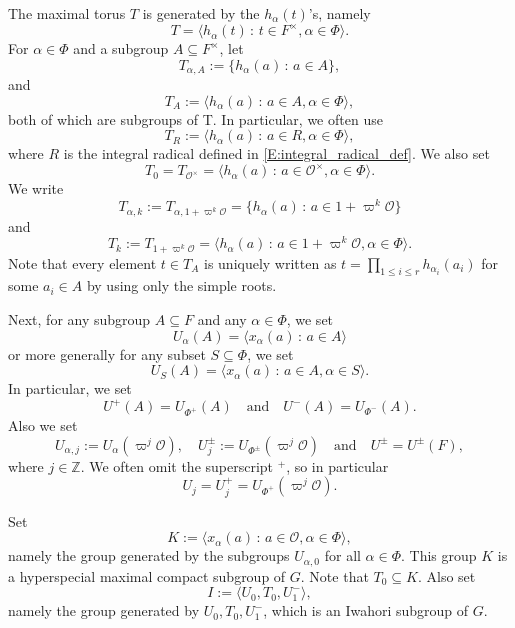 \documentclass[10pt, letterpaper]{amsart}
\theoremstyle{plain}
\theoremstyle{definition}
\numberwithin{equation}{section}
\newcommand{\Z}{\mathbb{Z}}
\newcommand{\ha}{h_{\alpha}}
\newcommand{\Ocal}{\mathcal{O}}
\newcommand{\la}{\langle}
\newcommand{\ra}{\rangle}
\newcommand{\st}{\,:\,}
\newcommand{\qand}{{\quad\text{and}\quad}}
\begin{document}
The maximal torus $T$ is generated by the $\ha(t)$'s, namely
\[
T=\la\ha(t)\st t\in F^\times, \alpha\in\Phi\ra.
\]
For $\alpha\in \Phi$ and a subgroup $A\subseteq F^{\times}$, let 
\[
T_{\alpha, A}:=\{h_{\alpha}(a)\st a\in A\},
\]
and
\[
T_A:=\la h_{\alpha}(a)\st a\in A, \alpha\in\Phi\ra,
\]
both of which are subgroups of T. In particular, we often use
\begin{equation}\label{E:def_of_T_R}
T_R:=\la h_{\alpha}(a)\st a\in R, \alpha\in\Phi\ra,
\end{equation}
where $R$ is the integral radical defined in \eqref{E:integral_radical_def}. We also set
\begin{equation}\label{E:def_of_T_0}
T_0=T_{\Ocal^{\times}}=\la h_{\alpha}(a)\st a\in \Ocal^{\times}, \alpha\in\Phi\ra.
\end{equation}
We write
\[
T_{\alpha, k}:=T_{\alpha, 1+\varpi^k\Ocal}=\{h_{\alpha}(a)\st a\in 1+\varpi^k\Ocal\}
\]
and
\begin{equation}\label{E:def_of_T_k}
T_{k}:=T_{1+\varpi^k\Ocal}=\la h_{\alpha}(a)\st a\in 1+\varpi^k\Ocal, \alpha\in\Phi\ra.
\end{equation}
Note that every element $t\in T_{A}$ is uniquely written as $t=\prod_{1\leq i\leq r}h_{\alpha_{i}}(a_{i})$ for some $a_i\in A$ by using only the simple roots. 


Next, for any subgroup $A\subseteq F$ and any $\alpha\in\Phi$, we set 
\[
U_{\alpha}(A)=\la x_{\alpha}(a)\st a\in A\ra
\] 
or more generally for any subset $S\subseteq \Phi$, we set
\[
U_{S}(A)=\la x_{\alpha}(a)\st a\in A, \alpha\in S\ra.
\] 
In particular, we set
\[
U^{+}(A)=U_{\Phi^{+}}(A)\qand U^{-}(A)=U_{\Phi^{-}}(A).
\]
Also we set
\begin{equation}\label{E:notation_U_alpha_j}
U_{\alpha, j}:=U_{\alpha}(\varpi^j\Ocal),\quad U_j^{\pm}:=U_{\Phi^{\pm}}(\varpi^j\Ocal)\qand U^{\pm}=U^{\pm}(F),
\end{equation}
where $j\in\Z$. We often omit the superscript $^+$, so in particular
\begin{equation}\label{E:notation_U_j}
U_j=U_j^+=U_{\Phi^{+}}(\varpi^j\Ocal).
\end{equation}

Set
\[
K:=\la x_{\alpha}(a)\st a\in\Ocal, \alpha\in\Phi\ra,
\]
namely the group generated by the subgroups $U_{\alpha,0}$ for all $\alpha\in\Phi$. This group $K$ is a hyperspecial maximal compact subgroup of $G$. Note that $T_{0}\subseteq K$. Also set
\[
I:=\la U_0, T_0, U_1^-\ra,
\]
namely the group generated by $U_0, T_0, U_1^-$, which is an Iwahori subgroup of $G$.
\end{document}

